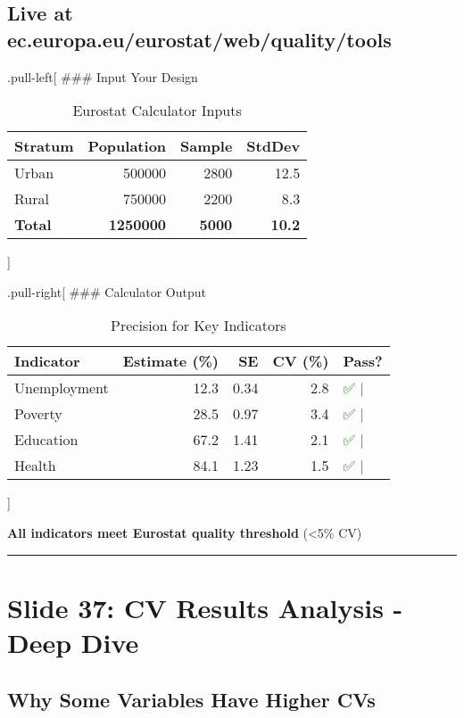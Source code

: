 \documentclass[
]{article}
\begin{document}
\subsection{Live at
ec.europa.eu/eurostat/web/quality/tools}\label{live-at-ec.europa.eueurostatwebqualitytools}

.pull-left{[} \#\#\# Input Your Design

\begin{longtable}[t]{lrrr}
\caption{\label{tab:eurostat-input}Eurostat Calculator Inputs}\\
\toprule
Stratum & Population & Sample & StdDev\\
\midrule
Urban & 500000 & 2800 & 12.5\\
Rural & 750000 & 2200 & 8.3\\
\textbf{Total} & \textbf{1250000} & \textbf{5000} & \textbf{10.2}\\
\bottomrule
\end{longtable}

{]}

.pull-right{[} \#\#\# Calculator Output

\begin{longtable}[t]{lrrr>{}l}
\caption{\label{tab:eurostat-output}Precision for Key Indicators}\\
\toprule
Indicator & Estimate (\%) & SE & CV (\%) & Pass?\\
\midrule
Unemployment & 12.3 & 0.34 & 2.8 & \textcolor{green}{✅    |}\\
Poverty & 28.5 & 0.97 & 3.4 & \textcolor{green}{✅    |}\\
Education & 67.2 & 1.41 & 2.1 & \textcolor{green}{✅    |}\\
Health & 84.1 & 1.23 & 1.5 & \textcolor{green}{✅    |}\\
\bottomrule
\end{longtable}

{]}

\textbf{All indicators meet Eurostat quality threshold} (\textless5\%
CV)

\begin{center}\rule{0.5\linewidth}{0.5pt}\end{center}

\section{Slide 37: CV Results Analysis - Deep
Dive}\label{slide-37-cv-results-analysis---deep-dive}

\subsection{Why Some Variables Have Higher
CVs}\label{why-some-variables-have-higher-cvs}
\end{document}
